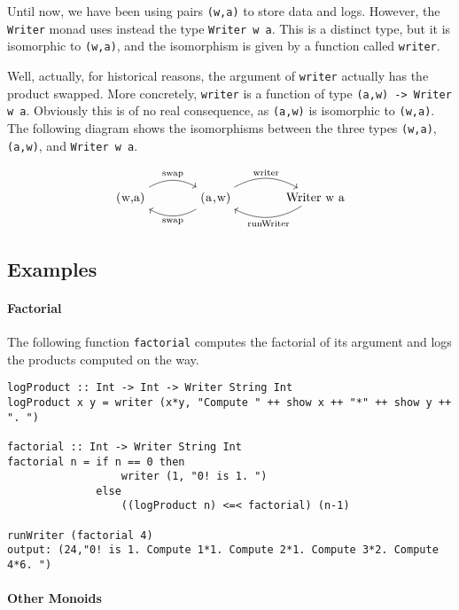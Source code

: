 \documentclass[11pt]{article}
\theoremstyle{nonumberplain}
\newcommand*\lsin{\lstinline}
\newcommand*\lsmath[1]{\text{\lstinline|#1|}}
\begin{document}
Until now, we have been using pairs \lsin|(w,a)| to store data and logs. However, the \lsin|Writer| monad uses instead the type \lsin|Writer w a|. This is a distinct type, but it is isomorphic to \lsin|(w,a)|, and the isomorphism is given by a function called \lsin|writer|.

Well, actually, for historical reasons, the argument of \lsin|writer| actually has the product swapped. More concretely, \lsin|writer| is a function of type \lsin|(a,w) -> Writer w a|. Obviously this is of no real consequence, as \lsin|(a,w)| is isomorphic to \lsin|(w,a)|. The following diagram shows the isomorphisms between the three types \lsin|(w,a)|, \lsin|(a,w)|, and \lsin|Writer w a|.

\begin{equation}
\begin{tikzcd}[column sep = large]
\lsmath{(w,a)} \arrow[r, bend left, "\lsmath{swap}"] & \arrow[l, bend left, "\lsmath{swap}"] \lsmath{(a,w)} \arrow[r, bend left, "\lsmath{writer}"] & \lsmath{Writer w a} \arrow[l, bend left, "\lsmath{runWriter}"]
\end{tikzcd}
\end{equation}

\subsection{Examples}

\paragraph{Factorial}
The following function \lsin|factorial| computes the factorial of its argument and logs the products computed on the way.

\begin{lstlisting}
logProduct :: Int -> Int -> Writer String Int
logProduct x y = writer (x*y, "Compute " ++ show x ++ "*" ++ show y ++ ". ")

factorial :: Int -> Writer String Int
factorial n = if n == 0 then
                  writer (1, "0! is 1. ") 
              else
                  ((logProduct n) <=< factorial) (n-1)

runWriter (factorial 4)
output: (24,"0! is 1. Compute 1*1. Compute 2*1. Compute 3*2. Compute 4*6. ")
\end{lstlisting}

\paragraph{Other Monoids}
\end{document}
